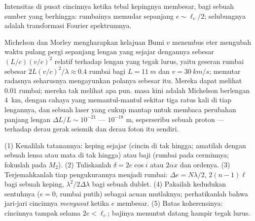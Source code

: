 \begin{omfigure}

{\small Intensitas di pusat cincinnya ketika tebal kepingnya
membesar, bagi sebuah sumber yang  berhingga: rumbainya memudar sepanjang
$e \sim \ell_c/2$; selubungnya adalah transformasi Fourier spektrumnya.}
\end{omfigure}

\begin{remark}\label{rem:b2:michelson:history}
Michelson dan Morley mengharapkan kelajuan Bumi $v$ menembus
eter mengubah waktu pulang pergi sepanjang lengan yang sejajar dengannya sebesar
$(L/c)(v/c)^2$ relatif terhadap lengan yang tegak lurus, yaitu geseran rumbai sebesar
$2L(v/c)^2/\lambda \approx 0.4$ rumbai bagi $L = \qty{11}{m}$ dan $v = \qty{30}{km/s}$;
memutar radasnya seharusnya mengayunkan polanya sebesar itu.
Mereka dapat melihat $0.01$ rumbai; mereka tak melihat apa pun.  masa kini adalah Michelson berlengan \qty{4}{km}, dengan cahaya yang memantul-mantul
sekitar tiga ratus kali di tiap lengannya, dan sebuah laser yang cukup mantap untuk membaca
perubahan panjang lengan $\Delta L/L \sim 10^{-21}$ --- $10^{-18}$ m, seperseribu
sebuah proton --- terhadap derau gerak seismik dan derau foton
itu sendiri.
\end{remark}

\begin{method}\label{met:b2:michelson:method}
(1) Kenalilah tatanannya: keping sejajar (cincin di tak hingga;
amatilah dengan sebuah lensa atau mata di tak hingga) atau baji (rumbai pada
cerminnya; fokuslah pada $M_2$). (2) Tuliskanlah $\delta = 2e\cos i$ atau $2\alpha x$ dan
ordenya. (3) Terjemahkanlah tiap pengukurannya menjadi rumbai: $\Delta e = N\lambda/2$,
$2(n - 1)\ell$ bagi sebuah keping, $\lambda^2/2\Delta\lambda$ bagi sebuah dublet. (4) Pakailah
kedudukan sentuhnya ($e = 0$, rumbai putih) sebagai acuan mutlaknya;
perhatikanlah bahwa jari-jari cincinnya \emph{menyusut} ketika $e$ membesar. (5) Batas
koherensinya: cincinnya tampak selama $2e < \ell_c$; bajinya menuntut
datang hampir tegak lurus.
\end{method}

